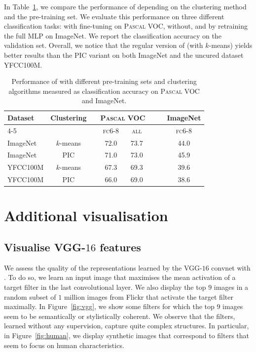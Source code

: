In Table~\ref{tab:classif}, we compare the performance of \OURS depending on the clustering method and the pre-training set.
We evaluate this performance on three different classification tasks: with fine-tuning on \textsc{Pascal} VOC, without, and by retraining the full MLP on ImageNet.
We report the classification accuracy on the validation set.
Overall, we notice that the regular version of \OURS (with $k$-means) yields better results than the PIC variant on both ImageNet and the uncured dataset YFCC100M.

\begin{table}[h!]
  \centering
  \begin{tabular}{@{}lcccccc@{}}
    \toprule
     Dataset & Clustering&& \multicolumn{2}{c}{\textsc{Pascal} VOC} &~~& ImageNet \\
                                        \cmidrule{4-5} \cmidrule{7-7}
        &&& \textsc{fc6-8} & \textsc{all} && \textsc{fc6-8} \\
    \midrule
    ImageNet & $k$-means && 72.0  & 73.7  && 44.0  \\
    ImageNet & PIC        && 71.0  & 73.0  && 45.9 \\
    YFCC100M & $k$-means  && 67.3  & 69.3  && 39.6 \\
    YFCC100M & PIC        && 66.0  & 69.0  && 38.6 \\
    \bottomrule
  \end{tabular}
  \caption{
    Performance of \OURS with different pre-training sets and clustering algorithms measured as classification accuracy on \textsc{Pascal} VOC and ImageNet.
  }
  \label{tab:classif}
\end{table}

\section{Additional visualisation}
\subsection{Visualise VGG-$16$ features}
We assess the quality of the representations learned by the VGG-$16$ convnet with \OURS.
To do so, we learn an input image that maximises the mean activation of a target filter in the last convolutional layer.
We also display the top $9$ images in a random subset of $1$ million images from Flickr that activate the target filter maximally.
In Figure~\ref{fig:vgg}, we show some filters for which the top $9$ images seem to be semantically or stylistically coherent.
We observe that the filters, learned without any supervision, capture quite complex structures.
In particular, in Figure~\ref{fig:human}, we display synthetic images that correspond to filters that seem to focus on human characteristics.

